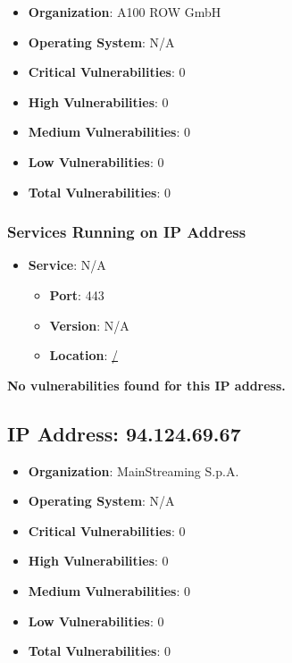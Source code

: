 \documentclass{article}
\begin{document}
\begin{itemize}
    \item \textbf{Organization}: A100 ROW GmbH
    \item \textbf{Operating System}:  N/A 
    \item \textbf{Critical Vulnerabilities}: 0
    \item \textbf{High Vulnerabilities}: 0
    \item \textbf{Medium Vulnerabilities}: 0
    \item \textbf{Low Vulnerabilities}: 0
    \item \textbf{Total Vulnerabilities}: 0
\end{itemize}

\subsubsection*{Services Running on IP Address}

\begin{itemize}
    
        \item \textbf{Service}: N/A
        \begin{itemize}
            \item \textbf{Port}: 443
            \item \textbf{Version}:  N/A 
            \item \textbf{Location}: \href{ / }{ / }
        \end{itemize}
    
\end{itemize}


\textbf{No vulnerabilities found for this IP address.}




\clearpage



\subsection{IP Address: 94.124.69.67}

\begin{itemize}
    \item \textbf{Organization}: MainStreaming S.p.A.
    \item \textbf{Operating System}:  N/A 
    \item \textbf{Critical Vulnerabilities}: 0
    \item \textbf{High Vulnerabilities}: 0
    \item \textbf{Medium Vulnerabilities}: 0
    \item \textbf{Low Vulnerabilities}: 0
    \item \textbf{Total Vulnerabilities}: 0
\end{itemize}
\end{document}
